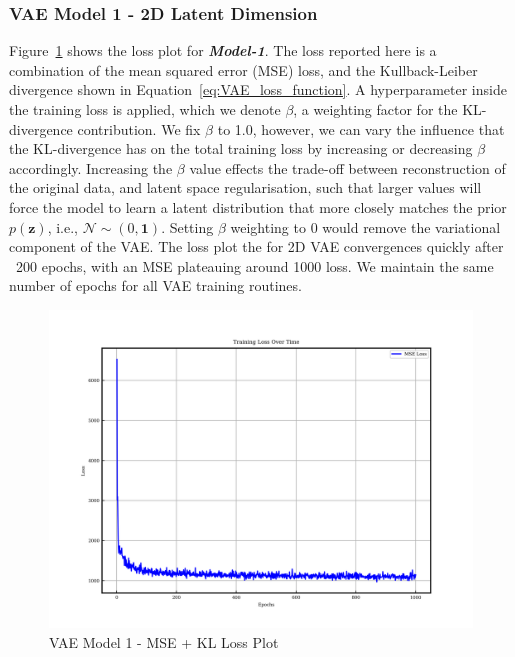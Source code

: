 \documentclass{article}
\begin{document}
\newpage{}
\subsubsection{VAE Model 1 - 2D Latent Dimension}

Figure~\ref{fig:model1_loss_plot} shows the loss plot for \textbf{\textit{Model-1}}. The loss reported here is a combination of the mean squared error (MSE) loss, and the Kullback-Leiber divergence shown in Equation~\ref{eq:VAE_loss_function}. A hyperparameter inside the training loss is applied, which we denote $\beta$, a weighting factor for the KL-divergence contribution. We fix $\beta$ to 1.0, however, we can vary the influence that the KL-divergence has on the total training loss by increasing or decreasing $\beta$ accordingly. Increasing the $\beta$ value effects the trade-off between reconstruction of the original data, and latent space regularisation, such that larger values will force the model to learn a latent distribution that more closely matches the prior $p(\textbf{z})$, i.e., $\mathcal{N}\sim(0,\textbf{1})$. Setting $\beta$ weighting to 0 would remove the variational component of the VAE. The loss plot the for 2D VAE convergences quickly after ~200 epochs, with an MSE plateauing around 1000 loss. We maintain the same number of epochs for all VAE training routines.

\begin{figure}[H]
\centering
    \includegraphics[width=0.75\linewidth]{figures/VAEmodels/model1/loss_plot.png}
    \caption{VAE Model 1 - MSE + KL Loss Plot}
    \label{fig:model1_loss_plot}
\end{figure}
\end{document}
